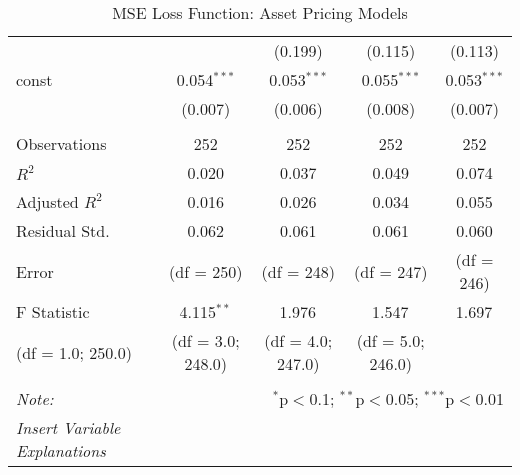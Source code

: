\begin{table}[H]
\begin{tabular}{@{\extracolsep{5pt}}lcccc}
                      &                                                                                  & (0.199)           & (0.115)           & (0.113)       \\
    const             & 0.054$^{***}$                                                                    & 0.053$^{***}$     & 0.055$^{***}$     & 0.053$^{***}$ \\
                      & (0.007)                                                                          & (0.006)           & (0.008)           & (0.007)       \\
    \hline                                                                                                                                                       \\[-1.8ex]
    Observations      & 252                                                                              & 252               & 252               & 252           \\
    $R^2$             & 0.020                                                                            & 0.037             & 0.049             & 0.074         \\
    Adjusted $R^2$    & 0.016                                                                            & 0.026             & 0.034             & 0.055         \\
    Residual Std.     & 0.062                                                                            & 0.061             & 0.061             & 0.060         \\
    Error             & (df = 250)                                                                       & (df = 248)        & (df = 247)        & (df = 246)    \\
    F Statistic       & 4.115$^{**}$                                                                     & 1.976$^{}$        & 1.547$^{}$        & 1.697$^{}$    \\
    (df = 1.0; 250.0) & (df = 3.0; 248.0)                                                                & (df = 4.0; 247.0) & (df = 5.0; 246.0)                 \\
    \hline
    \hline                                                                                                                                                       \\[-1.8ex]
    \textit{Note:}    & \multicolumn{4}{r}{$^{*}$p$<$0.1; $^{**}$p$<$0.05; $^{***}$p$<$0.01}                                                                     \\
    \textit{Insert Variable Explanations}                                                                                                                        \\
  \end{tabular}
  \caption{MSE Loss Function: Asset Pricing Models}
  \label{mse-tf-apm}
\end{table}
